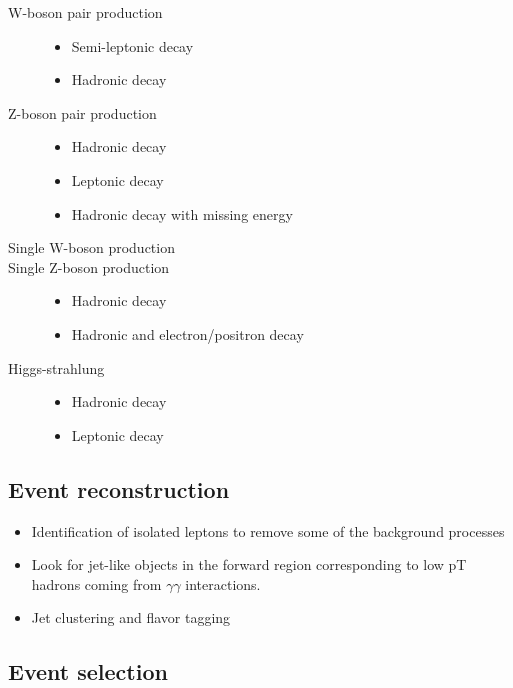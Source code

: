    
   \begin{description}
      \item[W-boson pair production] 
      \begin{itemize}
        \item Semi-leptonic decay
        \item Hadronic decay
      \end{itemize}
      \item[Z-boson pair production]
      \begin{itemize}
        \item Hadronic decay
        \item Leptonic decay
        \item Hadronic decay with missing energy
      \end{itemize}
      \item[Single W-boson production]
      \item[Single Z-boson production]
      \begin{itemize}
        \item Hadronic decay
        \item Hadronic and electron/positron decay
      \end{itemize}
      \item[Higgs-strahlung]
      \begin{itemize}
        \item Hadronic decay
        \item Leptonic decay
      \end{itemize}
   \end{description}
 
  \subsection{Event reconstruction}

  \begin{itemize}
    \item Identification of isolated leptons to remove some of the background processes
    \item Look for jet-like objects in the forward region corresponding to low pT hadrons coming from $\gamma \gamma$ interactions.
    \item Jet clustering and flavor tagging
  \end{itemize}

  \subsection{Event selection}
